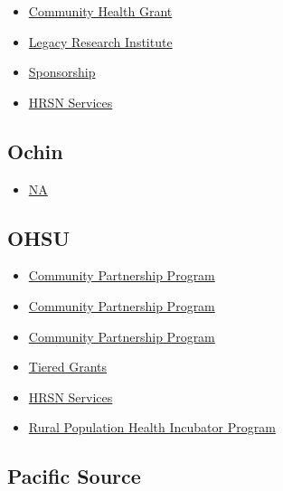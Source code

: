 \documentclass[
  letterpaper,
  DIV=11,
  numbers=noendperiod]{scrreprt}
\providecommand{\tightlist}{%
  \setlength{\itemsep}{0pt}\setlength{\parskip}{0pt}}\usepackage{longtable,booktabs,array}
\begin{document}
\begin{itemize}
\tightlist
\item
  \href{https://www.legacyhealth.org/Giving-and-Support/community-engagement/Community-Grants}{Community
  Health Grant}
\item
  \href{https://www.legacyhealth.org/For-Health-Professionals/legacy-research-institute/services/grants}{Legacy
  Research Institute}
\item
  \href{https://www.legacyhealth.org/Giving-and-Support/community-engagement/Sponsorships}{Sponsorship}
\item
  \href{HealthRelatedServices@pacificsource.com}{HRSN Services}
\end{itemize}

\subsection{Ochin}\label{ochin}

\begin{itemize}
\tightlist
\item
  \url{NA}
\end{itemize}

\subsection{OHSU}\label{ohsu}

\begin{itemize}
\tightlist
\item
  \href{https://www.ohsu.edu/knight-cancer-institute/community-partnership-program-grants}{Community
  Partnership Program}
\item
  \href{https://www.ohsu.edu/knight-cancer-institute/how-apply-community-grant}{Community
  Partnership Program}
\item
  \href{https://www.ohsu.edu/sites/default/files/2024-01/CPP_RFP_2024.1_FINAL_lowres_0.pdf}{Community
  Partnership Program}
\item
  \href{https://www.ohsu.edu/knight-cancer-institute/tiered-grants}{Tiered
  Grants}
\item
  \href{https://www.ohsu.edu/health-services}{HRSN Services}
\item
  \href{https://www.ohsu.edu/oregon-office-of-rural-health/rural-population-health-incubator-program}{Rural
  Population Health Incubator Program}
\end{itemize}

\subsection{Pacific Source}\label{pacific-source}
\end{document}
